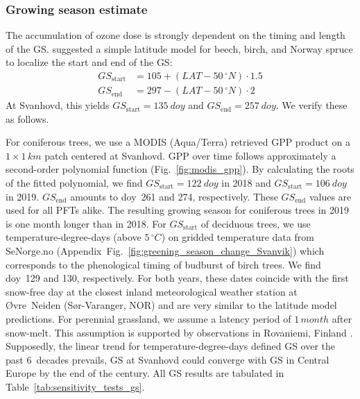 \documentclass[bg, manuscript]{copernicus}
\begin{document}
\subsubsection{Growing season estimate}
\label{subsec:gs_est}

The accumulation of ozone dose is strongly dependent on the timing and length of the GS. \citet{ICP:MappingManual2017} suggested a simple latitude model for beech, birch, and Norway spruce to localize the start and end of the GS:
%
\begin{align}
  GS_\mathrm{start} &= 105 + (LAT-50\,\unit{^\circ N})\cdot 1.5\\
  GS_\mathrm{end} &= 297 - (LAT-50\,\unit{^\circ N})\cdot 2
\end{align}
%
At Svanhovd, this yields $GS_\mathrm{start}=135~\unit{doy}$ and $GS_\mathrm{end}=257~\unit{doy}$. We verify these as follows.

For coniferous trees, we use a MODIS (Aqua/Terra) retrieved GPP product \citep{MODIS_PSN} on a $1\times 1\,\unit{km}$ patch centered at Svanhovd. GPP over time follows approximately a second-order polynomial function (Fig.~\ref{fig:modis_gpp}). By calculating the roots of the fitted polynomial, we find $GS_\text{start}=122~\unit{doy}$ in 2018 and $GS_\text{start}=106~\unit{doy}$ in 2019. $GS_\text{end}$ amounts to \unit{doy}~261 and 274, respectively. These $GS_\mathrm{end}$ values are used for all PFTs alike. The resulting growing season for coniferous trees in 2019 is one month longer than in 2018. For $GS_\text{start}$ of deciduous trees, we use temperature-degree-days (above $5\,\unit{^\circ C}$) on gridded temperature data from SeNorge.no (Appendix~Fig.~\ref{fig:greening_season_change_Svanvik}) which corresponds to the phenological timing of budburst of birch trees. We find \unit{doy}~129 and 130, respectively. For both years, these dates coincide with the first snow-free day at the closest inland meteorological weather station at Øvre~Neiden (Sør-Varanger, NOR) and are very similar to the latitude model predictions. For perennial grassland, we assume a latency period of $1\,\unit{month}$ after snow-melt. This assumption is supported by observations in Rovaniemi, Finland \citep[][Supplement~Fig.~S1]{FCR:Korhonen2018}. Supposedly, the linear trend for temperature-degree-days defined GS over the past 6~decades prevails, GS at Svanhovd could converge with GS in Central Europe by the end of the century. All GS results are tabulated in Table~\ref{tab:sensitivity_tests_gs}.
\end{document}
